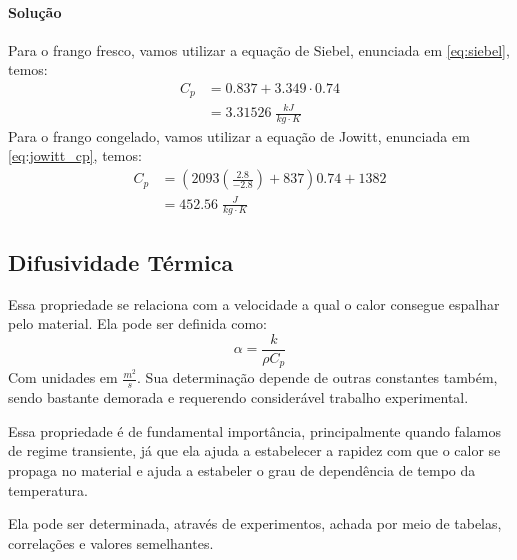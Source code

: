 \paragraph{Solução}
Para o frango fresco, vamos utilizar a equação de Siebel, enunciada em \ref{eq:siebel}, temos:
\begin{align*}
    C_{p} &= 0.837 + 3.349 \cdot  0.74\\
    &= 3.31526 \; \frac{kJ}{kg \cdot K}
\end{align*}
Para o frango congelado, vamos utilizar a equação de Jowitt, enunciada em \ref{eq:jowitt_cp}, temos:
\begin{align*}
    C_{p} &= \left( 2093 \left( \frac{2.8}{-2.8} \right) + 837 \right) 0.74 + 1382\\
    &= 452.56 \; \frac{J}{kg \cdot K}
\end{align*}
\subsection{Difusividade Térmica}
Essa propriedade se relaciona com a velocidade a qual o calor consegue espalhar pelo material. Ela
pode ser definida como:
\begin{equation}\label{eq:difusividade_termica}
    \alpha = \frac{k}{\rho C_{p} }
\end{equation}
Com unidades em \(\frac{m^2}{s}\). Sua determinação depende de outras constantes também, sendo
bastante demorada e requerendo considerável trabalho experimental. \par

Essa propriedade é de fundamental importância, principalmente quando falamos de regime transiente,
já que ela ajuda a estabelecer a rapidez com que o calor se propaga no material e ajuda a estabeler
o grau de dependência de tempo da temperatura. \par

Ela pode ser determinada, através de experimentos, achada por meio de tabelas, correlações e valores
semelhantes. \par

